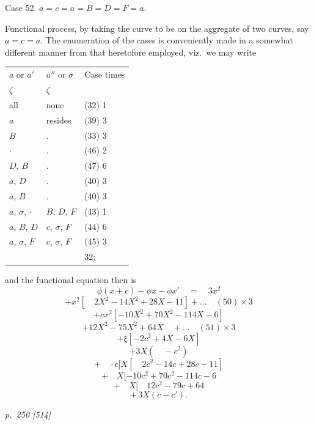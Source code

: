 \documentclass[11pt,a4paper]{article}
\theoremstyle{plain}
\theoremstyle{definition}
\begin{document}
Case 52.  $a = c = a = B = D = F = a$.

Functional process, by taking the curve to be on the aggregate of two curves, say
$a = c = a$.  The enumeration of the cases is conveniently made in a somewhat different
manner from that heretofore employed, viz.\ we may write

\begin{center}
\begin{tabular}{lll}
$a$ or $a'$ & $a''$ or $\sigma$ & Case \quad times \\
$\zeta$ & $\zeta$ &  \\
\hline
all  & none  & (32)  1 \\
$a$ & resides & (39)  3 \\
$B$ & . & (33)  3 \\
$\cdot$ & . & (46)  2 \\
$D$, $B$ & . & (47)  6 \\
$a$, $D$ & . & (40)  3 \\
$a$, $B$ & . & (40)  3 \\
$a$, $\sigma$, $\cdot$ & $B$, $D$, $F$ & (43)  1 \\
$a$, $B$, $D$ & $c$, $\sigma$, $F$ & (44)  6 \\
$a$, $\sigma$, $F$ & $c$, $\sigma$, $F$ & (45)  3 \\
\hline
& & 32; \\
\end{tabular}
\end{center}

and the functional equation then is
\[
\phi(x + c) - \phi x - \phi x' \quad = \quad 3x^2
\]
\[
+ x^2[\quad 2X^2 - 14X^2 + 28X - 11] + \ldots \quad (50) \times 3
\]
\[
+ c x^2 [-10X^2 + 70X^2 - 114X - 6]
\]
\[
+ 12X^2 - 75X^2 + 64X \quad + \ldots \quad (51) \times 3
\]
\[
+ \xi [-2c^2 + 4X - 6X]
\]
\[
+ 3X(\quad - c^2)
\]
\[
+ \quad \cdot c[X[ \quad 2c^2 - 14c + 28c - 11 ]
\]
\[
+ \quad X[ -10c^2 + 70c^2 - 114c - 6
\]
\[
+ \quad X[ \quad 12c^2 - 79c + 64
\]
\[
+ \,3X(c - c').
\]

\clearpage

\bigskip
\textit{p.~250 [514]}
\smallskip
\end{document}
